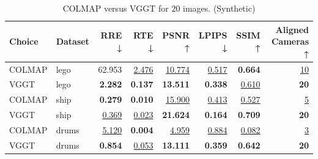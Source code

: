 \begin{table}[H]
\caption{COLMAP versus VGGT for $20$ images. (Synthetic)}
\label{tab:01_num_images_sparse_synthetic}
\centering
\scriptsize
\begin{tabular}{llrrrrrr}
\toprule
Choice & Dataset & RRE ↓ & RTE ↓ & PSNR ↑ & LPIPS ↓ & SSIM ↑ & Aligned Cameras ↑ \\
\midrule
COLMAP & lego & 62.953 & \underline{2.476} & \underline{10.774} & \underline{0.517} & \textbf{0.664} & \underline{10} \\
VGGT & lego & \textbf{2.282} & \textbf{0.137} & \textbf{13.511} & \textbf{0.338} & \underline{0.610} & \textbf{20} \\
\midrule
COLMAP & ship & \textbf{0.279} & \textbf{0.010} & \underline{15.900} & \underline{0.413} & \underline{0.527} & \underline{5} \\
VGGT & ship & \underline{0.369} & \underline{0.023} & \textbf{21.624} & \textbf{0.164} & \textbf{0.709} & \textbf{20} \\
\midrule
COLMAP & drums & \underline{5.120} & \textbf{0.004} & \underline{4.959} & \underline{0.884} & \underline{0.082} & \underline{3} \\
VGGT & drums & \textbf{0.854} & \underline{0.053} & \textbf{13.111} & \textbf{0.359} & \textbf{0.642} & \textbf{20} \\
\bottomrule
\end{tabular}
\end{table}